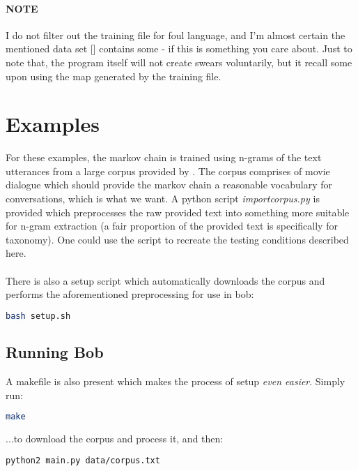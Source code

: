 \documentclass[]{article}
\begin{document}
\paragraph{NOTE} I do not filter out the training file for foul language, and I'm almost certain the mentioned data set [] contains some - if this is something you care about. Just to note that, the program itself will not create swears voluntarily, but it recall some upon using the map generated by the training file.

\section{Examples}

For these examples, the markov chain is trained using n-grams of the text utterances from a large corpus provided by \cite{Danescu-Niculescu-Mizil+Lee:11a}. The corpus comprises of movie dialogue which should provide the markov chain a reasonable vocabulary for conversations, which is what we want. A python script \emph{importcorpus.py} is provided which preprocesses the raw provided text into something more suitable for n-gram extraction (a fair proportion of the provided text is specifically for taxonomy). One could use the script to recreate the testing conditions described here.
\\\\
There is also a setup script which automatically downloads the corpus and performs the aforementioned preprocessing for use in bob:
\begin{lstlisting}[language=bash, frame=single]
bash setup.sh
\end{lstlisting}

\subsection{Running Bob}

A makefile is also present which makes the process of setup \emph{even easier}. Simply run:

\begin{lstlisting}[language=bash, frame=single]
make
\end{lstlisting}

...to download the corpus and process it, and then:

\begin{lstlisting}[language=bash, frame=single]
python2 main.py data/corpus.txt
\end{lstlisting}
\end{document}
